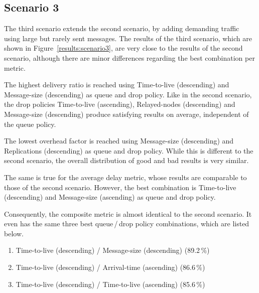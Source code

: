 \documentclass[conference,10pt,letterpaper,final]{IEEEtran}
\begin{document}
\subsection{Scenario 3}
\label{subsec:evaluation:scenario3}

The third scenario extends the second scenario, by adding demanding traffic using large but rarely sent messages.
The results of the third scenario, which are shown in Figure~\ref{results:scenario3}, are very close to the results of the second scenario, although there are minor differences regarding the best combination per metric.

The highest delivery ratio is reached using Time-to-live (descending) and Message-size (descending) as queue and drop policy.
Like in the second scenario, the drop policies Time-to-live (ascending), Relayed-nodes (descending) and Message-size (descending) produce satisfying results on average, independent of the queue policy.

The lowest overhead factor is reached using Message-size (descending) and Replications (descending) as queue and drop policy.
While this is different to the second scenario, the overall distribution of good and bad results is very similar.

The same is true for the average delay metric, whose results are comparable to those of the second scenario.
However, the best combination is Time-to-live (descending) and Message-size (ascending) as queue and drop policy.

Consequently, the composite metric is almost identical to the second scenario. It even has the same three best queue\,/\,drop policy combinations, which are listed below.

\begin{enumerate}
 \item Time-to-live (descending) / Message-size (descending) (89.2\,\%)
 \vspace{0.1cm}
 \item Time-to-live (descending) / Arrival-time (ascending) (86.6\,\%)
 \vspace{0.1cm}
 \item Time-to-live (descending) / Time-to-live (ascending) (85.6\,\%)
 \vspace{0.1cm}
\end{enumerate}
\end{document}

